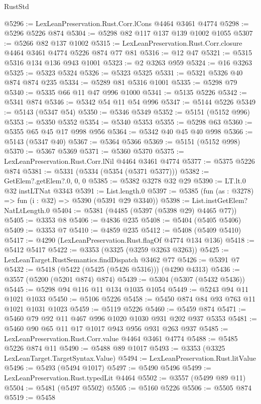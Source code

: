\begin{lexlean}{RustStd}
\begin{coremodule}
@5296 := LexLeanPreservation.Rust.Corr.lCons @4464 @3461 @4774
@5298 := @5296 @5226 @874
@5304 := @5298 @82 @117 @137 @139 @1002 @1055
@5307 := @5266 @82 @137 @1002
@5315 := LexLeanPreservation.Rust.Corr.closure @4464 @3461 @4774 @5226 @874 @77 @81
@5316 := @12 @47
@5321 := @5315 @5316 @134 @136 @943 @1001
@5323 := @2 @3263 @959
@5324 := @16 @3263
@5325 := @5323 @5324
@5326 := @5323 @5325
@5331 := @5321 @5326 @40 @874 @874 @235
@5334 := @5289 @81 @5316 @1001
@5335 := @5298 @79
@5340 := @5335 @66 @11 @47 @996 @1000
@5341 := @5135 @5226
@5342 := @5341 @874
@5346 := @5342 @54 @11 @54 @996
@5347 := @5144 @5226
@5349 := @5143 (@5347 @54)
@5350 := @5346 @5349
@5352 := @5151 (@5152 @996)
@5353 := @5350 @5352
@5354 := @5340 @5353
@5355 := @5298 @63
@5360 := @5355 @65 @45 @17 @998 @956
@5364 := @5342 @40 @45 @40 @998
@5366 := @5143 (@5347 @40)
@5367 := @5364 @5366
@5369 := @5151 (@5152 @998)
@5370 := @5367 @5369
@5371 := @5360 @5370
@5375 := LexLeanPreservation.Rust.Corr.lNil @4464 @3461 @4774
@5377 := @5375 @5226 @874
@5381 := @5331 (@5334 (@5354 (@5371 @5377)))
@5382 := GetElem?.getElem?.{0, 0, 0}
@5385 := @5382 @3278 @32 @29
@5390 := LT.lt.{0} @32 instLTNat @3343
@5391 := List.length.{0}
@5397 := @5385 (fun (as : @3278) => fun (i : @32) => @5390 (@5391 @29 @3340))
@5398 := List.instGetElem?NatLtLength.{0}
@5404 := @5381 (@4485 (@5397 (@5398 @29) @4465 @77))
@5405 := @3353 @8
@5406 := @4836 @235
@5408 := @5404 (@5405 @5406)
@5409 := @3353 @7
@5410 := @4859 @235
@5412 := @5408 (@5409 @5410)
@5417 := @4290 (LexLeanPreservation.Rust.flagOf @4774 @134 @136)
@5418 := @5412 @5417
@5422 := @3353 (@3325 (@3259 @3263 @3263))
@5425 := LexLeanTarget.RustSemantics.findDispatch @3462 @77
@5426 := @5391 @7
@5432 := @5418 (@5422 (@5425 (@5426 @5316))) (@4290 @4313)
@5436 := @3557 (@5200 (@5201 @874) @874)
@5439 := @5304 (@5307 (@5432 @5436))
@5445 := @5298 @94 @116 @11 @134 @1035 @1054
@5449 := @5243 @94 @11 @1021 @1033
@5450 := @5106 @5226
@5458 := @5450 @874 @84 @93 @763 @11 @1021 @1031 @1023
@5459 := @5119 @5226
@5460 := @5459 @874
@5471 := @5460 @79 @92 @11 @467 @996 @1020 @1030 @931 @202 @937 @5353
@5481 := @5460 @90 @65 @11 @17 @1017 @943 @956 @931 @263 @937
@5485 := LexLeanPreservation.Rust.Corr.value @4464 @3461 @4774
@5488 := @5485 @5226 @874 @11
@5490 := @5488 @89 @1017
@5493 := @3353 (@3325 LexLeanTarget.TargetSyntax.Value)
@5494 := LexLeanPreservation.Rust.litValue
@5496 := @5493 (@5494 @1017)
@5497 := @5490 @5496
@5499 := LexLeanPreservation.Rust.typedLit @4464
@5502 := @3557 (@5499 @89 @11)
@5504 := @5481 (@5497 @5502)
@5505 := @5160 @5226
@5506 := @5505 @874
@5519 := @5458

\end{coremodule}
\end{lexlean}

